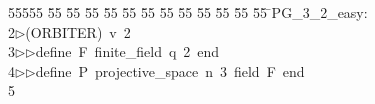 %
%
\begin{tabbing}
55555 \= 55 \= 55 \= 55 \= 55 \= 55 \= 55 \= 55 \= 55 \= 55 \= 55 \= 55 \= 55 \= \>PG\_3\_2\_easy:\\[0pt]
2\>$\triangleright$\>(ORBITER)\ v\ 2\ \\[0pt]
3\>$\triangleright$\>$\triangleright$\>define\ F\ finite\_field\ q\ 2\ end\ \\[0pt]
4\>$\triangleright$\>$\triangleright$\>define\ P\ projective\_space\ n\ 3\ field\ F\ end\\[0pt]
5\>\end{tabbing}
